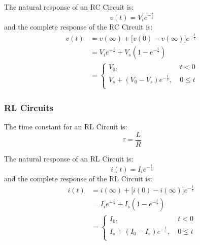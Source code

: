 \documentclass[12pt]{article}
\begin{document}
The natural response of an RC Circuit is:
\begin{equation*}
  v(t) = V_ie^{-\frac{t}{\tau}}
\end{equation*}
and the complete response of the RC Circuit is:
\begin{align*}
  v(t) &= v(\infty) + \big[v(0)-v(\infty)\big]e^{-\frac{t}{\tau}} \\
       &= V_ie^{-\frac{t}{\tau}} + V_s\left(1-e^{-\frac{t}{\tau}}\right) \\
       &= \begin{cases}
         V_0 ,&\ t < 0 \\
         V_s + (V_0-V_s)e^{-\frac{t}{\tau}} ,&\ 0 \leq t \\
       \end{cases}
\end{align*}

\subsubsection{RL Circuits}
\label{sssec:rlCircuitsSummary}
The time constant for an RL Circuit is:
\begin{equation*}
  \tau = \frac{L}{R}
\end{equation*}

The natural response of an RL Circuit is:
\begin{equation*}
  i(t) = I_ie^{-\frac{t}{\tau}}
\end{equation*}
and the complete response of the RL Circuit is:
\begin{align*}
  i(t) &= i(\infty) + \big[i(0)-i(\infty)\big]e^{-\frac{t}{\tau}} \\
       &= I_ie^{-\frac{t}{\tau}} + I_s\left(1-e^{-\frac{t}{\tau}}\right) \\
       &= \begin{cases}
         I_0 ,&\ t < 0 \\
         I_s + (I_0-I_s)e^{-\frac{t}{\tau}} ,&\ 0 \leq t \\
       \end{cases}
\end{align*}
\end{document}

